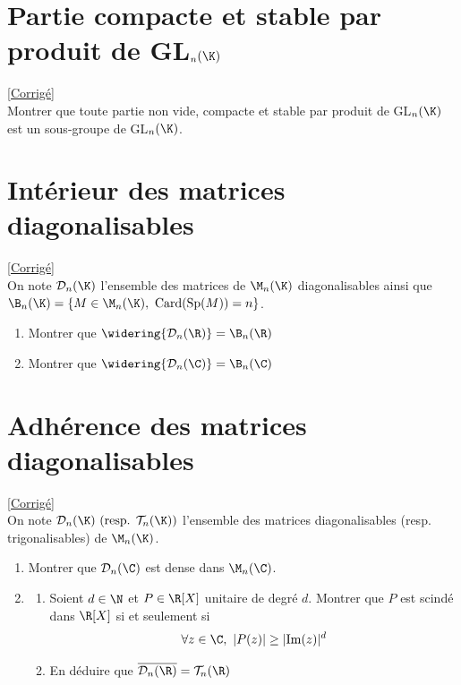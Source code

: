 \documentclass{book}
\begin{document}
\section{Partie compacte et stable par produit de GL$_n(\K)$ }
\label{Partie compacte et stable par produit de GLn(K)}
\textcolor{blue}{\hyperref[sec:partie-compacte-et-stable-par-produit-de-glnk-etoile3]{[Corrigé]}}\\
Montrer que toute partie non vide, compacte et stable par produit de GL$_n(\K)$ est un sous-groupe de GL$_n(\K)$.

\section{Intérieur des matrices diagonalisables }
\label{Intérieur des matrices diagonalisables}
\textcolor{blue}{\hyperref[sec:interieur-des-matrices-diagonalisable-etoile5]{[Corrigé]}}\\
On note $\mathcal{D}_n(\K)$ l'ensemble des matrices de $\M_n(\K)$ diagonalisables ainsi que $\B_n(\K)=\{M\in\M_n(\K),\ \text{Card}(\operatorname{Sp}(M))=n\}$.\\
\begin{enumerate}
	\item Montrer que $\widering{\mathcal{D}_n(\R)}=\B_n(\R)$
	\item Montrer que $\widering{\mathcal{D}_n(\C)}=\B_n(\C)$
\end{enumerate}

\section{Adhérence des matrices diagonalisables }
\label{Adhérence des matrices diagonalisables}
\textcolor{blue}{\hyperref[sec:adherence-des-matrices-diagonalisables-etoile3]{[Corrigé]}}\\
On note $\mathcal{D}_n(\K) \text{ (resp. } \mathcal{T}_n(\K))$ l'ensemble des matrices diagonalisables (resp. trigonalisables) de $\M_n(\K)$.
\begin{enumerate}
	\item Montrer que $\mathcal{D}_n(\C)$ est dense dans $\M_n(\C)$.
	\item \begin{enumerate}[label=\alph*.]
		\item Soient $d\in \N$ et $P\in \R[X]$ unitaire de degré $d$. Montrer que $P$ est scindé dans $\R[X]$ si et seulement si $$\forall z\in \C,\ |P(z)|\geq |\text{Im}(z)|^d$$
		\item En déduire que $\overline{\mathcal{D}_n(\R)}=\mathcal{T}_n(\R)$
	\end{enumerate}
\end{enumerate}
\end{document}
